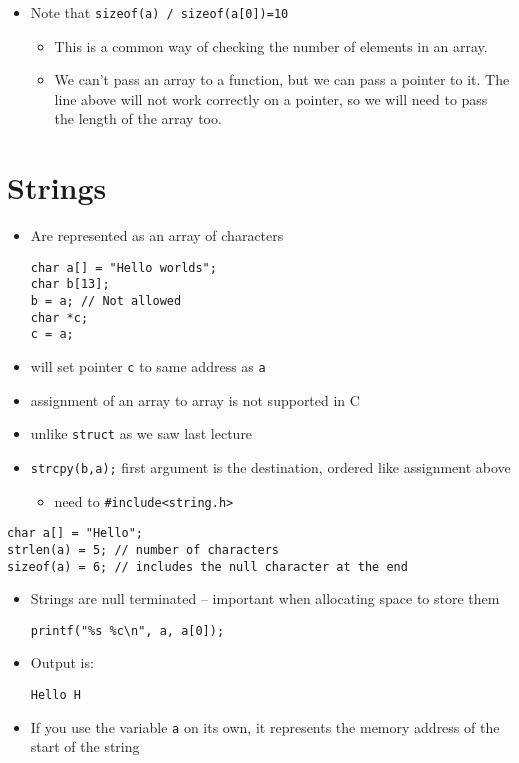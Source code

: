 \documentclass{article}
\begin{document}
\begin{itemize}
\item Note that \verb!sizeof(a) / sizeof(a[0])=10!
\begin{itemize}
\item This is a common way of checking the number of elements in an array.
\item We can't pass an array to a function, but we can pass a pointer to it. The line above will not work correctly on a pointer, so we will need to pass the length of the array too.
\end{itemize}
\end{itemize}



\section{Strings}
\begin{itemize}
\item Are represented as an array of characters
\begin{verbatim}
char a[] = "Hello worlds";
char b[13];
b = a; // Not allowed
char *c;
c = a;
\end{verbatim}
\item will set pointer \verb!c! to same address as \verb!a!
\item assignment of an array to array is not supported in C
\item unlike \verb!struct! as we saw last lecture
\item \verb!strcpy(b,a);!  first argument is the destination, ordered like assignment above
\begin{itemize}
\item need to \verb!#include<string.h>!
\end{itemize}
\end{itemize}




\begin{verbatim}
char a[] = "Hello";
strlen(a) = 5; // number of characters
sizeof(a) = 6; // includes the null character at the end
\end{verbatim}

\begin{itemize}
\item Strings are null terminated -- important when allocating space to store them
\begin{verbatim}
printf("%s %c\n", a, a[0]);
\end{verbatim}
\item Output is:
\begin{verbatim}
Hello H
\end{verbatim}

\item If you use the variable \verb!a! on its own, it represents the memory address of the start of the string
\end{itemize}
\end{document}
